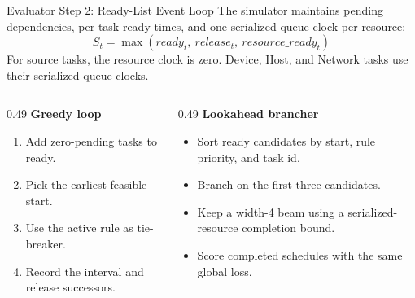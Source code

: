 \documentclass[aspectratio=169]{beamer}
\begin{document}
\begin{frame}{Evaluator Step 2: Ready-List Event Loop}
  \small
  The simulator maintains pending dependencies, per-task ready times, and one serialized queue clock per resource:
  \[
    S_t=\max(ready_t,\ release_t,\ resource\_ready_t)
  \]
  For source tasks, the resource clock is zero. Device, Host, and Network tasks
  use their serialized queue clocks.

  \begin{columns}[T,onlytextwidth]
    \begin{column}{0.49\textwidth}
      \textbf{Greedy loop}
      \begin{enumerate}
        \item Add zero-pending tasks to ready.
        \item Pick the earliest feasible start.
        \item Use the active rule as tie-breaker.
        \item Record the interval and release successors.
      \end{enumerate}
    \end{column}
    \begin{column}{0.49\textwidth}
      \textbf{Lookahead brancher}
      \begin{itemize}
        \item Sort ready candidates by start, rule priority, and task id.
        \item Branch on the first three candidates.
        \item Keep a width-4 beam using a serialized-resource completion bound.
        \item Score completed schedules with the same global loss.
      \end{itemize}
    \end{column}
  \end{columns}
\end{frame}
\end{document}
